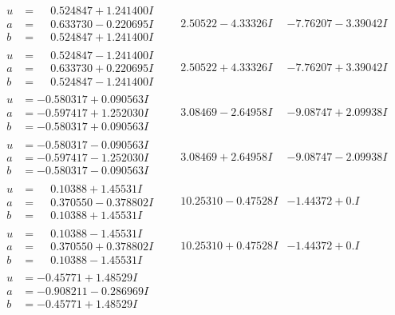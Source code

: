 \documentclass[1p]{elsarticle_modified}
\theoremstyle{definition}
\begin{document}
$$\begin{array}{c|c|c}
\begin{aligned}
u &= \phantom{-}0.524847 + 1.241400 I \\
a &= \phantom{-}0.633730 - 0.220695 I \\
b &= \phantom{-}0.524847 + 1.241400 I\end{aligned}
 & \phantom{-}2.50522 - 4.33326 I & -7.76207 - 3.39042 I \\ \hline\begin{aligned}
u &= \phantom{-}0.524847 - 1.241400 I \\
a &= \phantom{-}0.633730 + 0.220695 I \\
b &= \phantom{-}0.524847 - 1.241400 I\end{aligned}
 & \phantom{-}2.50522 + 4.33326 I & -7.76207 + 3.39042 I \\ \hline\begin{aligned}
u &= -0.580317 + 0.090563 I \\
a &= -0.597417 + 1.252030 I \\
b &= -0.580317 + 0.090563 I\end{aligned}
 & \phantom{-}3.08469 - 2.64958 I & -9.08747 + 2.09938 I \\ \hline\begin{aligned}
u &= -0.580317 - 0.090563 I \\
a &= -0.597417 - 1.252030 I \\
b &= -0.580317 - 0.090563 I\end{aligned}
 & \phantom{-}3.08469 + 2.64958 I & -9.08747 - 2.09938 I \\ \hline\begin{aligned}
u &= \phantom{-}0.10388 + 1.45531 I \\
a &= \phantom{-}0.370550 - 0.378802 I \\
b &= \phantom{-}0.10388 + 1.45531 I\end{aligned}
 & \phantom{-}10.25310 - 0.47528 I & -1.44372 + 0. I\phantom{ +0.000000I} \\ \hline\begin{aligned}
u &= \phantom{-}0.10388 - 1.45531 I \\
a &= \phantom{-}0.370550 + 0.378802 I \\
b &= \phantom{-}0.10388 - 1.45531 I\end{aligned}
 & \phantom{-}10.25310 + 0.47528 I & -1.44372 + 0. I\phantom{ +0.000000I} \\ \hline\begin{aligned}
u &= -0.45771 + 1.48529 I \\
a &= -0.908211 - 0.286969 I \\
b &= -0.45771 + 1.48529 I\end{aligned}

\end{array}$$
\end{document}
